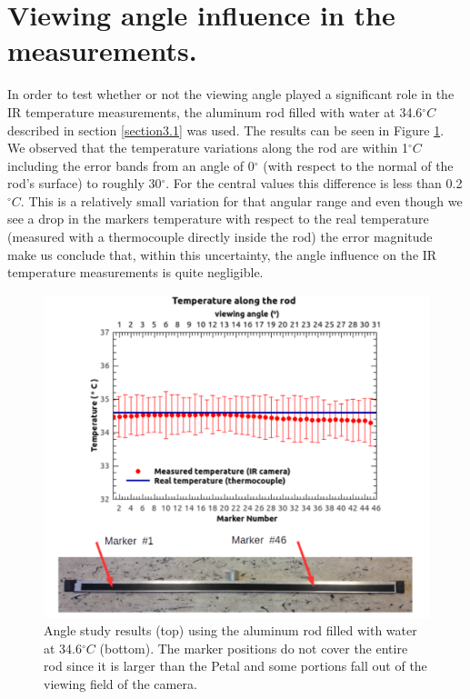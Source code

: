 	\section{Viewing angle influence in the measurements.}\label{section4.5}
	
		In order to test whether or not the viewing angle played a significant role in the IR temperature measurements, the aluminum rod filled with water at 34.6\space$^\circ C$ described in section \ref{section3.1} was used. The results can be seen in Figure \ref{fig4.8}. 
		We observed that the temperature variations along the rod are within 1\space$^\circ C$ including the error bands from an angle of 0$^\circ$ (with respect to the normal of the rod's surface) to roughly 30$^\circ$. For the central values this difference is less than 0.2\space$^\circ C$. This is a relatively small variation for that angular range and even though we see a drop in the markers temperature with respect to the real temperature (measured with a thermocouple directly inside the rod) the error magnitude make us conclude that, within this uncertainty, the angle influence on the IR temperature measurements is quite negligible.
		
		\begin{figure}[ht!]
			\centering
			\captionsetup{justification=centering,margin=0cm}
			\includegraphics[scale=0.4]{Figures/Chapter04/RodAngularTempResults.pdf}
			\caption{Angle study results (top) using the aluminum rod filled with water at 34.6\space$^\circ C$ (bottom). The marker positions do not cover the entire rod since it is larger than the Petal and some portions fall out of the viewing field of the camera.}\label{fig4.8}
		\end{figure}
	
